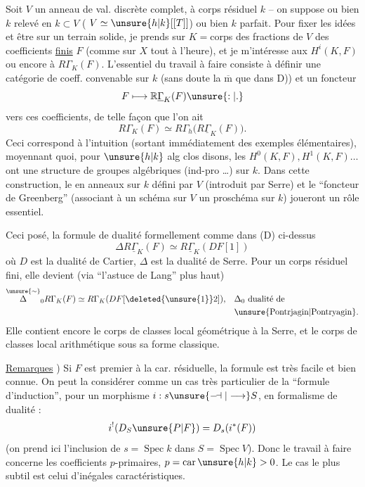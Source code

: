 Soit $V$ un anneau de val. discrète complet, à corps résiduel $k$ -- on suppose ou bien $k$ relevé en $k\subset V$ ( $V\simeq\unsure{h|k}[[T]]$) ou bien $k$ parfait. Pour fixer les idées et être sur un terrain solide, je prends  sur $K={}$corps des fractions de $V$ des coefficients \uline{finis} $F$ (comme sur $X$ tout à l'heure), et je m'intéresse aux $H^i(K,F)$ ou encore à $R\Gamma_K(F)$. L'essentiel du travail à faire consiste à définir une catégorie de coeff. convenable sur $k$ (sans doute la $\overline{\mathrm m}$ que dans D)) et un foncteur
\[
 F\longmapsto\mathbb{R}\underline{\Gamma}_K(F)\unsure{:|.}
\]
vers ces coefficients, de telle façon que l'on ait
\[
 R\Gamma_K(F)\simeq R\Gamma_h\bigl(R\underline{\Gamma}_K(F)\bigr).
\]
Ceci correspond à l'intuition (sortant immédiatement des exemples élémentaires), moyennant quoi, pour $\unsure{h|k}$ alg clos disons, les $H^0(K,F), H^1(K,F)\ldots$ ont une structure de groupes algébriques (ind-pro \ldots) sur $k$. Dans cette construction, le  en anneaux sur $k$ défini par $V$ (introduit par Serre) et le ``foncteur de Greenberg'' (associant à un schéma sur $V$ un proschéma sur $k$) joueront un rôle essentiel.

Ceci posé, la formule de dualité  formellement comme dans (D) ci-dessus
\[
 \Delta R\underline{\Gamma}_K(F)\simeq R\underline{\Gamma}_K(DF[1])
\]
où $D$ est la dualité de Cartier, $\Delta$ est la dualité de Serre. Pour un corps résiduel fini, elle devient (via ``l'astuce de Lang'' plus haut)
\[
 \begin{aligned}
 \overset{\unsure{\sim}}{\Delta}_0 R\Gamma_K(F)\simeq R\Gamma_K(DF[\deleted{\unsure{1}}2]),&\quad \Delta_0\ \text{dualité de}\\
 &\quad\text{\unsure{Pontrjagin|Pontryagin}.}
 \end{aligned}
\]
Elle contient encore le corps de classes local géométrique à la Serre, et le corps de classes local arithmétique sous sa forme classique.

\uline{Remarques} ) Si $F$ est premier à la car. résiduelle, la formule est très facile et bien connue. On peut la considérer comme un cas très particulier
de la ``formule d'induction'', pour un morphisme $i:s\unsure{\relbar\joinrel\dashv|\longrightarrow}S$, en formalisme de dualité :
\[
 i^!(D_S\unsure{P|F})=D_s(i^*(F))
\]
(on prend ici l'inclusion de $s=\operatorname{Spec}k$ dans $S=\operatorname{Spec}V$). Donc le travail à faire concerne les coefficients $p$-primaires, $p=\operatorname{car}\unsure{h|k}>0$. Le cas le plus subtil est celui d'inégales caractéristiques.

